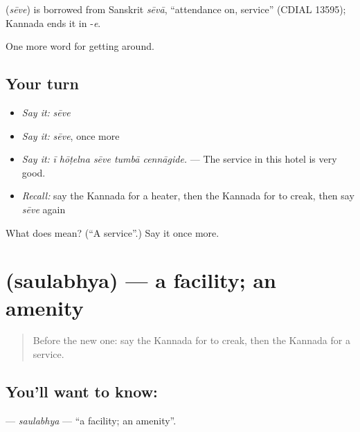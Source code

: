\begin{cousinweb}
\textbf{} (\emph{sēve}) is borrowed from Sanskrit \emph{sēvā}, \textquotedblleft{}attendance on, service\textquotedblright{} (CDIAL 13595); Kannada ends it in -\emph{e}.
\end{cousinweb}

\begin{grammarlens}[title={What you've built}]
One more word for getting around.
\end{grammarlens}

\subsection*{Your turn}
\begin{itemize}
\raggedright
  \item \emph{Say it:} \emph{sēve}
  \item \emph{Say it:} \emph{sēve}, once more
  \item \emph{Say it:} \emph{ī hōṭelna sēve tumbā cennāgide.} — The service in this hotel is very good.
  \item \emph{Recall:} say the Kannada for a heater, then the Kannada for to creak, then say \emph{sēve} again
\end{itemize}

\begin{tcolorbox}[breakable,colback=teal!4,colframe=teal!35!black,title={Before you move on}]
What does  mean? (\textquotedblleft{}A service\textquotedblright{}.) Say it once more.
\end{tcolorbox}
\section[\texorpdfstring{\kn{ಸೌಲಭ್ಯ} (saulabhya)}{ಸೌಲಭ್ಯ (saulabhya)}]{ (saulabhya) — a facility; an amenity}

\label{lesson:KA-C463-saulabhya}



\begin{quote}
Before the new one: say the Kannada for to creak, then the Kannada for a service.
\end{quote}

\subsection*{You'll want to know: }
\textbf{} — \emph{saulabhya} — \textquotedblleft{}a facility; an amenity\textquotedblright{}.

